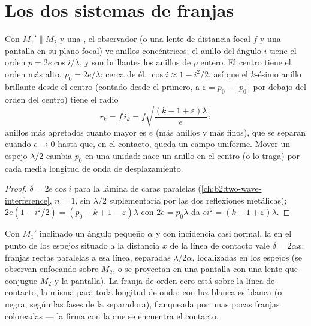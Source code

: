 \section{Los dos sistemas de franjas}

\begin{proposition}\label{prop:b2:michelson:rings}
Con $M_1' \parallel M_2$ y una , el observador (o una lente
de distancia focal $f$ y una pantalla en su plano focal) ve anillos
concéntricos; el anillo del ángulo $i$ tiene el orden $p = 2e\cos i/\lambda$, y son
brillantes los anillos de $p$ entero. El centro tiene el orden más alto, $p_0 =
2e/\lambda$; cerca de él, $\cos i \approx 1 - i^2/2$, así que el $k$-ésimo anillo brillante desde el
centro (contado desde el primero, a $\varepsilon = p_0 - \lfloor p_0\rfloor$
por debajo del orden del centro) tiene el radio
\[
r_k = f\,i_k = f\sqrt{\frac{(k - 1 + \varepsilon)\lambda}e} :
\]
anillos más apretados cuanto mayor es $e$ (más anillos y más finos), que se separan cuando $e \to 0$
hasta que, en el contacto, queda un campo uniforme. Mover un espejo $\lambda/2$ cambia
$p_0$ en una unidad: nace un anillo en el centro (o lo traga) por cada
media longitud de onda de desplazamiento.
\end{proposition}

\begin{proof}
$\delta = 2e\cos i$ para la lámina de caras paralelas (\cref{ch:b2:two-wave-interference},
$n = 1$, sin $\lambda/2$ suplementaria por las dos reflexiones metálicas); $2e(1 - i^2/2) =
(p_0 - k + 1 - \varepsilon)\lambda$ con $2e = p_0\lambda$ da $ei^2 = (k - 1 + \varepsilon)\lambda$.
\end{proof}

\begin{proposition}\label{prop:b2:michelson:wedge}
Con $M_1'$ inclinado un ángulo pequeño $\alpha$ y con incidencia casi normal, la
 en el punto de los espejos situado a la distancia $x$ de la
línea de contacto vale $\delta = 2\alpha x$: franjas rectas paralelas a esa línea,
separadas $\lambda/2\alpha$, localizadas en los espejos (se observan enfocando
sobre $M_2$, o se proyectan en una pantalla con una lente que conjugue $M_2$ y la
pantalla). La franja de orden cero está sobre la línea de contacto, la misma para
toda longitud de onda: con luz blanca es blanca (o negra, según
las fases de la separadora), flanqueada por unas pocas franjas coloreadas --- la
firma con la que se encuentra el contacto.
\end{proposition}


